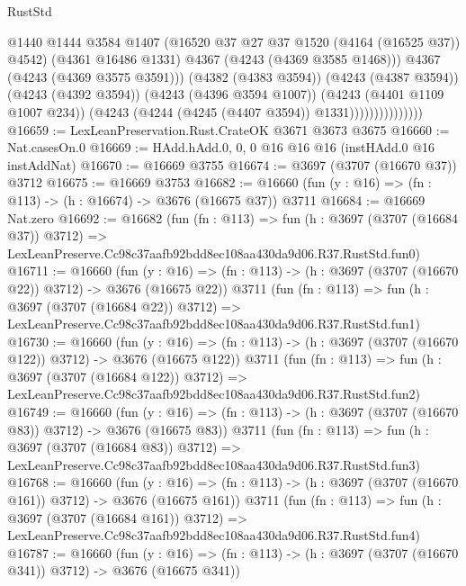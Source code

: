 \begin{lexlean}{RustStd}
\begin{coremodule}
                                  @1440
                                  @1444
                                  @3584
                                  @1407
                                  (@16520 @37 @27 @37 @1520 (@4164 (@16525 @37)) @4542)
                                  (@4361 @16486 @1331)
                                  @4367
                                  (@4243 (@4369 @3585 @1468)))
                                @4367
                                (@4243 (@4369 @3575 @3591)))
                              (@4382 (@4383 @3594))
                              (@4243 (@4387 @3594))
                              (@4243 (@4392 @3594))
                              (@4243 (@4396 @3594 @1007))
                              (@4243 (@4401 @1109 @1007 @234))
                              (@4243 (@4244 (@4245 (@4407 @3594)) @1331)))))))))))))))
@16659 := LexLeanPreservation.Rust.CrateOK @3671 @3673 @3675
@16660 := Nat.casesOn.{0}
@16669 := HAdd.hAdd.{0, 0, 0} @16 @16 @16 (instHAdd.{0} @16 instAddNat)
@16670 := @16669 @3755
@16674 := @3697 (@3707 (@16670 @37)) @3712
@16675 := @16669 @3753
@16682 := @16660 (fun (y : @16) => (fn : @113) -> (h : @16674) -> @3676 (@16675 @37)) @3711
@16684 := @16669 Nat.zero
@16692 := @16682
    (fun (fn : @113) =>
    fun (h : @3697 (@3707 (@16684 @37)) @3712) =>
    LexLeanPreserve.Cc98c37aafb92bdd8ec108aa430da9d06.R37.RustStd.fun0)
@16711 := @16660
    (fun (y : @16) => (fn : @113) -> (h : @3697 (@3707 (@16670 @22)) @3712) -> @3676 (@16675 @22))
    @3711
    (fun (fn : @113) =>
    fun (h : @3697 (@3707 (@16684 @22)) @3712) =>
    LexLeanPreserve.Cc98c37aafb92bdd8ec108aa430da9d06.R37.RustStd.fun1)
@16730 := @16660
    (fun (y : @16) => (fn : @113) -> (h : @3697 (@3707 (@16670 @122)) @3712) -> @3676 (@16675 @122))
    @3711
    (fun (fn : @113) =>
    fun (h : @3697 (@3707 (@16684 @122)) @3712) =>
    LexLeanPreserve.Cc98c37aafb92bdd8ec108aa430da9d06.R37.RustStd.fun2)
@16749 := @16660
    (fun (y : @16) => (fn : @113) -> (h : @3697 (@3707 (@16670 @83)) @3712) -> @3676 (@16675 @83))
    @3711
    (fun (fn : @113) =>
    fun (h : @3697 (@3707 (@16684 @83)) @3712) =>
    LexLeanPreserve.Cc98c37aafb92bdd8ec108aa430da9d06.R37.RustStd.fun3)
@16768 := @16660
    (fun (y : @16) => (fn : @113) -> (h : @3697 (@3707 (@16670 @161)) @3712) -> @3676 (@16675 @161))
    @3711
    (fun (fn : @113) =>
    fun (h : @3697 (@3707 (@16684 @161)) @3712) =>
    LexLeanPreserve.Cc98c37aafb92bdd8ec108aa430da9d06.R37.RustStd.fun4)
@16787 := @16660
    (fun (y : @16) => (fn : @113) -> (h : @3697 (@3707 (@16670 @341)) @3712) -> @3676 (@16675 @341))

\end{coremodule}
\end{lexlean}
